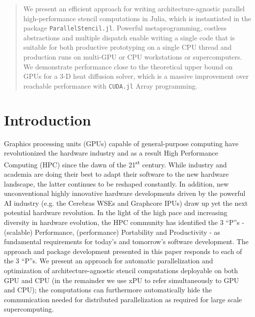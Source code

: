 \documentclass{juliacon}
\newcommand{\ts}{\textsuperscript}
\begin{document}


\maketitle

\begin{abstract}

We present an efficient approach for writing architecture-agnostic parallel high-performance stencil computations in Julia, which is instantiated in the package \texttt{ParallelStencil.jl}. Powerful metaprogramming, costless abstractions and multiple dispatch enable writing a single code that is suitable for both productive prototyping on a single CPU thread and production runs on multi-GPU or CPU workstations or supercomputers. We demonstrate performance close to the theoretical upper bound on GPUs for a 3-D heat diffusion solver, which is a massive improvement over reachable performance with \texttt{CUDA.jl} Array programming.

\end{abstract}

\section{Introduction}
Graphics processing units (GPUs) capable of general-purpose computing have revolutionized the hardware industry and as a result High Performance Computing (HPC) since the dawn of the 21\ts{st} century. While industry and academia are doing their best to adapt their software to the new hardware landscape, the latter continues to be reshaped constantly. In addition, new unconventional highly innovative hardware developments driven by the powerful AI industry (e.g. the Cerebras WSEs and Graphcore IPUs) draw up yet the next potential hardware revolution. In the light of the high pace and increasing diversity in hardware evolution, the HPC community has identified the 3 ``P''s - (scalable) Performance, (performance) Portability and Productivity - as fundamental requirements for today's and tomorrow's software development. The approach and package development presented in this paper responds to each of the 3 ``P''s. We present an approach for automatic parallelization and optimization of architecture-agnostic stencil computations deployable on both GPU and CPU (in the remainder we use xPU to refer simultaneously to GPU and CPU); the computations can furthermore automatically hide the communication needed for distributed parallelization as required for large scale supercomputing.
\end{document}
